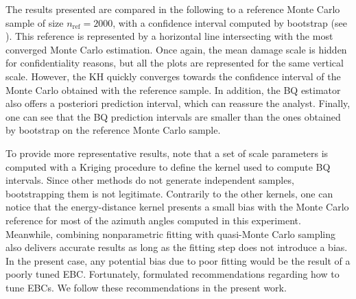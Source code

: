 The results presented are compared in the following to a reference Monte Carlo sample of size $n_{\mathrm{ref}} = 2000$, with a confidence interval computed by bootstrap (see ). 
This reference is represented by a horizontal line intersecting with the most converged Monte Carlo estimation.
Once again, the mean damage scale is hidden for confidentiality reasons, but all the plots are represented for the same vertical scale. 
However, the KH quickly converges towards the confidence interval of the Monte Carlo obtained with the reference sample. 
In addition, the BQ estimator also offers a posteriori prediction interval, which can reassure the analyst. 
Finally, one can see that the BQ prediction intervals are smaller than the ones obtained by bootstrap on the reference Monte Carlo sample. 

To provide more representative results, note that a set of scale parameters is computed with a Kriging procedure to define the kernel used to compute BQ intervals. 
Since other methods do not generate independent samples, bootstrapping them is not legitimate. 
Contrarily to the other kernels, one can notice that the energy-distance kernel presents a small bias with the Monte Carlo reference for most of the azimuth angles computed in this experiment. 
Meanwhile, combining nonparametric fitting with quasi-Monte Carlo sampling also delivers accurate results as long as the fitting step does not introduce a bias. 
In the present case, any potential bias due to poor fitting would be the result of a poorly tuned EBC. 
Fortunately, \cite{nagler_2017} formulated recommendations regarding how to tune EBCs. 
We follow these recommendations in the present work.



